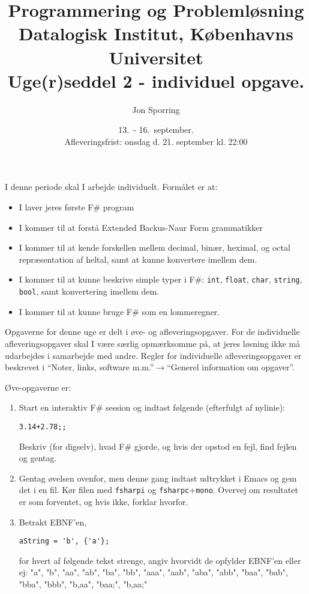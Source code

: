 \documentclass[a4paper,12pt]{article}
\title{Programmering og Problemløsning\\Datalogisk Institut,
  Københavns Universitet\\Uge(r)seddel 2 - individuel opgave.}
\author{Jon Sporring}
\date{13.\ - 16.\ september.\\Afleveringsfrist: onsdag d. 21. september kl. 22:00}
\begin{document}
\maketitle

I denne periode skal I arbejde individuelt. Formålet er at:
\begin{itemize}
\item I laver jeres første F\# program
\item I kommer til at forstå Extended Backus-Naur Form grammatikker
\item I kommer til at kende forskellen mellem decimal, binær, heximal, og octal repræsentation af heltal, samt at kunne konvertere imellem dem.
\item I kommer til at kunne beskrive simple typer i F\#: \lstinline{int}, \lstinline{float}, \lstinline{char}, \lstinline{string}, \lstinline{bool}, samt konvertering imellem dem.
\item I kommer til at kunne bruge F\# som en lommeregner.
\end{itemize}

Opgaverne for denne uge er delt i øve- og afleveringsopgaver. For de individuelle afleveringsopgaver skal I være særlig opmærksomme på, at jeres løsning ikke må udarbejdes i samarbejde med andre. Regler for individuelle afleveringsopgaver er beskrevet i "`Noter, links, software m.m."'$\rightarrow$"`Generel information om opgaver"'.

Øve-opgaverne er:
\begin{enumerate}[label=2.\arabic*,start=0]
\item Start en interaktiv F\# session og indtast følgende (efterfulgt af nylinie):
\begin{lstlisting}
3.14+2.78;;
\end{lstlisting}
Beskriv (for digselv), hvad F\# gjorde, og hvis der opstod en fejl, find fejlen og gentag.
\item Gentag øvelsen ovenfor, men denne gang indtast udtrykket i Emacs og gem det i en fil. Kør filen med \lstinline[language=console]{fsharpi} og \lstinline[language=console]{fsharpc}+\lstinline[language=console]{mono}. Overvej om resultatet er som forventet, og hvis ikke, forklar hvorfor.
\item Betrakt EBNF'en,
\begin{lstlisting}[language=ebnf]
aString = 'b', {'a'};
\end{lstlisting}
for hvert af følgende tekst strenge, angiv hvorvidt de opfylder EBNF'en eller ej: "a", "b", "aa", "ab", "ba", "bb", "aaa", "aab", "aba", "abb", "baa", "bab", "bba", "bbb", "b,aa", "baa;", "b,aa;"
\end{enumerate}
\end{document}
